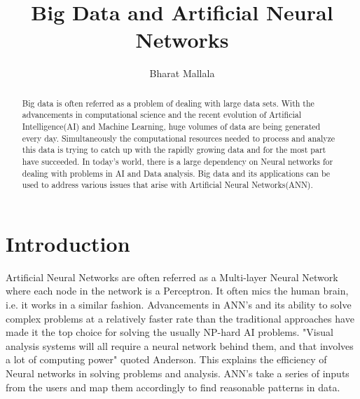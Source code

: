 \documentclass[sigconf]{acmart}
\begin{document}
\title{Big Data and Artificial Neural Networks}



\author{Bharat Mallala}


\renewcommand{\shortauthors}{B. Trovato et al.}


\begin{abstract}
Big data is often referred as a problem of dealing with large data sets. With the advancements in computational science and the recent evolution of Artificial Intelligence(AI) and Machine Learning, huge volumes of data are being generated every day. Simultaneously the computational resources needed to process and analyze this data is trying to catch up with the rapidly growing data and for the most part have succeeded. In today's world, there is a large dependency on Neural networks for dealing with problems in AI and Data analysis. Big data and its applications can be used to address various issues that arise with Artificial Neural Networks(ANN). 
\end{abstract}



\maketitle

\section{Introduction}

Artificial Neural Networks are often referred as a Multi-layer Neural Network where each node in the network is a Perceptron. It often mics the human brain, i.e. it works in a similar fashion. Advancements in ANN's and its ability to solve complex problems at a relatively faster rate than the traditional approaches have made it the top choice for solving the usually NP-hard AI problems. "Visual analysis systems will all require a neural network behind them, and that involves a lot of computing power"\cite{Anderson2017} quoted Anderson. This explains the efficiency of Neural networks in solving problems and analysis. ANN's take a series of inputs from the users and map them accordingly to find reasonable patterns in data.
\end{document}
